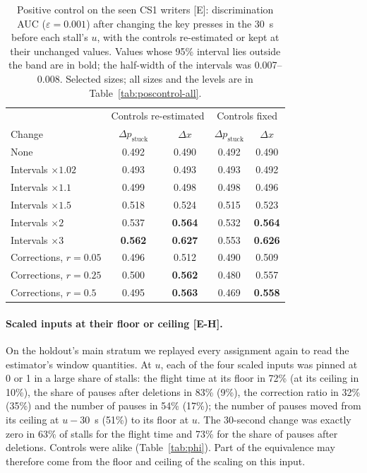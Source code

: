 \begin{table}
  \caption{Positive control on the seen CS1 writers [E]: discrimination AUC ($\varepsilon = 0.001$) after changing the key
  presses in the 30~s before each stall's $u$, with the controls re-estimated or kept at their unchanged values. Values
  whose 95\% interval lies outside the band are in bold; the half-width of the intervals was 0.007--0.008. Selected
  sizes; all sizes and the levels are in Table~\ref{tab:poscontrol-all}.}
  \label{tab:poscontrol}
  \centering\small
  \begin{tabular}{l cc cc}
    \toprule
    & \multicolumn{2}{c}{Controls re-estimated} & \multicolumn{2}{c}{Controls fixed} \\
    Change & $\Delta p_{\mathrm{stuck}}$ & $\Delta x$ & $\Delta p_{\mathrm{stuck}}$ & $\Delta x$ \\
    \midrule
    None & 0.492 & 0.490 & 0.492 & 0.490 \\
    Intervals $\times 1.02$ & 0.493 & 0.493 & 0.493 & 0.492 \\
    Intervals $\times 1.1$ & 0.499 & 0.498 & 0.498 & 0.496 \\
    Intervals $\times 1.5$ & 0.518 & 0.524 & 0.515 & 0.523 \\
    Intervals $\times 2$ & 0.537 & \textbf{0.564} & 0.532 & \textbf{0.564} \\
    Intervals $\times 3$ & \textbf{0.562} & \textbf{0.627} & 0.553 & \textbf{0.626} \\
    Corrections, $r = 0.05$ & 0.496 & 0.512 & 0.490 & 0.509 \\
    Corrections, $r = 0.25$ & 0.500 & \textbf{0.562} & 0.480 & 0.557 \\
    Corrections, $r = 0.5$ & 0.495 & \textbf{0.563} & 0.469 & \textbf{0.558} \\
    \bottomrule
  \end{tabular}
\end{table}

\paragraph{Scaled inputs at their floor or ceiling [E-H].} On the holdout's main stratum we replayed every assignment
again to read the estimator's window quantities. At
$u$, each of the four scaled inputs was pinned at 0 or 1 in a large share of stalls: the flight time at its floor in
72\% (at its ceiling in 10\%), the share of pauses after deletions in 83\% (9\%), the correction ratio in 32\% (35\%) and
the number of pauses in 54\% (17\%); the number of pauses moved from its ceiling at $u - 30$~s (51\%) to its floor at
$u$. The 30-second change was exactly zero in 63\% of stalls for the flight time and 73\% for the share of pauses after
deletions. Controls were alike (Table~\ref{tab:phi}). Part of the equivalence may therefore come from the floor and
ceiling of the scaling on this input.

